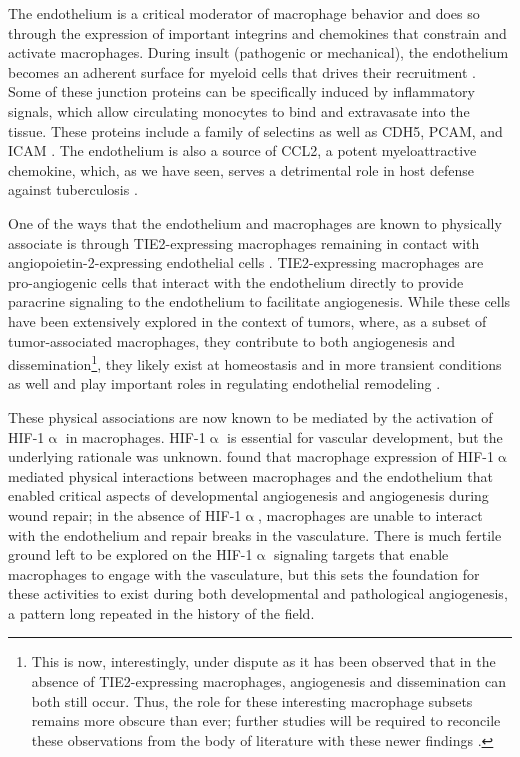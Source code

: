 The endothelium is a critical moderator of macrophage behavior and does so through the expression of important integrins and chemokines that constrain and activate macrophages. During insult (pathogenic or mechanical), the endothelium becomes an adherent surface for myeloid cells that drives their recruitment \citep{Kalucka2017}. Some of these junction proteins can be specifically induced by inflammatory signals, which allow circulating monocytes to bind and extravasate into the tissue. These proteins include a family of selectins as well as CDH5, PCAM, and ICAM \citep{Imhof2004}. The endothelium is also a source of CCL2, a potent myeloattractive chemokine, which, as we have seen, serves a detrimental role in host defense against tuberculosis \citep{Martin2007, Cambier2014b}. 

One of the ways that the endothelium and macrophages are known to physically associate is through TIE2\hyp{}expressing macrophages remaining in contact with angiopoietin\hyp{}2\hyp{}expressing endothelial cells \citep{Baer2013, DePalma2007, DePalma2011}. TIE2\hyp{}expressing macrophages are pro\hyp{}angiogenic cells that interact with the endothelium directly to provide paracrine signaling to the endothelium to facilitate angiogenesis. While these cells have been extensively explored in the context of tumors, where, as a subset of tumor\hyp{}associated macrophages, they contribute to both angiogenesis and dissemination\footnote{This is now, interestingly, under dispute as it has been observed that in the absence of TIE2\hyp{}expressing macrophages, angiogenesis and dissemination can both still occur. Thus, the role for these interesting macrophage subsets remains more obscure than ever; further studies will be required to reconcile these observations from the body of literature with these newer findings \citep{Jakab2022}.}, they likely exist at homeostasis and in more transient conditions as well and play important roles in regulating endothelial remodeling \citep{Duran2021, Lewis2007}.

These physical associations are now known to be mediated by the activation of HIF\hyp{}1$\upalpha$ in macrophages. HIF\hyp{}1$\upalpha$ is essential for vascular development, but the underlying rationale was unknown. \citet{Gerri2017} found that macrophage expression of HIF\hyp{}1$\upalpha$ mediated physical interactions between macrophages and the endothelium that enabled critical aspects of developmental angiogenesis and angiogenesis during wound repair; in the absence of HIF\hyp{}1$\upalpha$, macrophages are unable to interact with the endothelium and repair breaks in the vasculature. There is much fertile ground left to be explored on the HIF\hyp{}1$\upalpha$ signaling targets that enable macrophages to engage with the vasculature, but this sets the foundation for these activities to exist during both developmental and pathological angiogenesis, a pattern long repeated in the history of the field.

